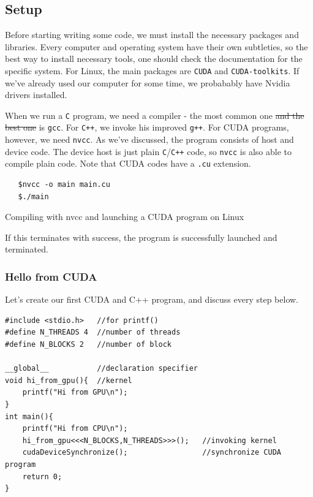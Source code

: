 \documentclass[12pt]{article}
\begin{document}
\subsection{Setup}
Before starting writing some code, we must install the necessary packages and libraries. Every computer and operating system 
have their own subtleties, so the best way to install necessary tools, one should check the documentation for the specific system.
For Linux, the main packages are \verb|CUDA| and \verb|CUDA-toolkits|. If we've already used our computer for some time,
we probabably have Nvidia drivers installed. 


When we run a \verb|C| program, we need a compiler - the most common one \sout{and the best one} is \verb|gcc|. For \verb|C++|, 
we invoke his improved \verb|g++|. For CUDA programs, however, we need \verb|nvcc|. As we've discussed, the program 
consists of host and device code. The device host is just plain \verb|C|/\verb|C++| code, so \verb|nvcc| is also able 
to compile plain code. Note that CUDA codes have a \verb|.cu| extension.

\begin{listing}[!ht]
\begin{verbatim}
   $nvcc -o main main.cu
   $./main
\end{verbatim}
\vspace{-0.7cm}
\caption{Compiling with nvcc and launching a CUDA program on Linux}
\label{nvcc_cuda}
\end{listing}

\vspace{-0.4cm}
If this terminates with success, the program is successfully launched and terminated. 

\subsubsection{Hello from CUDA}
Let's create our first CUDA and C++ program, and discuss every step below. 
\begin{verbatim}
#include <stdio.h>   //for printf()
#define N_THREADS 4  //number of threads
#define N_BLOCKS 2   //number of block

__global__           //declaration specifier 
void hi_from_gpu(){  //kernel
    printf("Hi from GPU\n");
}
int main(){
    printf("Hi from CPU\n");
    hi_from_gpu<<<N_BLOCKS,N_THREADS>>>();   //invoking kernel
    cudaDeviceSynchronize();                 //synchronize CUDA program
    return 0;
}
\end{verbatim}
\end{document}
